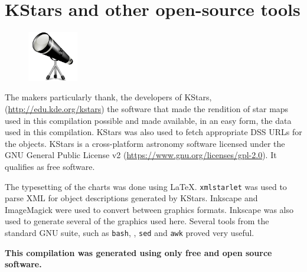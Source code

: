\section*{KStars and other open-source tools}
\begin{figure}
\centering
\includegraphics[width=0.195\textwidth]{kstars.pdf}
\end{figure}
The makers particularly thank, the developers of KStars,
(\url{http://edu.kde.org/kstars}) the software that made the rendition
of star maps used in this compilation possible and made available, in
an easy form, the data used in this compilation. KStars was also used
to fetch appropriate DSS URLs for the objects. KStars is a
cross-platform astronomy software licensed under the GNU General
Public License v2 (\url{https://www.gnu.org/licenses/gpl-2.0}). It
qualifies as free software.

The typesetting of the charts was done using
\LaTeX. \texttt{xmlstarlet} was used to parse XML for object
descriptions generated by KStars. Inkscape and ImageMagick were used
to convert between graphics formats. Inkscape was also used to
generate several of the graphics used here. Several tools from the
standard GNU suite, such as \texttt{bash}, , \texttt{sed}
and \texttt{awk} proved very useful.

\textbf{This compilation was generated using only free and open source
software.}
